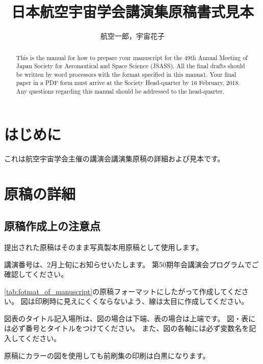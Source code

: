 \documentclass{jsass-nenkai}
\begin{document}

\title{日本航空宇宙学会講演集原稿書式見本}

\author{航空一郎，宇宙花子}


\begin{abstract}
  This is the manual for how to prepare your manuscript for the 49th Annual Meeting of Japan Society for Aeronautical and Space Science (JSASS).
  All the final drafts should be written by word processors with the format specified in this manua1.
  Your final paper in a PDF form must arrive at the Society Head-quarter by 16 February, 2018.
  Any questions regarding this manual should be addressed to the head-quarter.
\end{abstract}

\maketitle


\section{はじめに}
  これは航空宇宙学会主催の講演会講演集原稿の詳細および見本です。

\section{原稿の詳細}
  \subsection{原稿作成上の注意点}
    提出された原稿はそのまま写真製本用原稿として使用します。

    講演番号は、2月上旬にお知らせいたします。
    第50期年会講演会プログラムでご確認してください。

    \cref{tab:fotmat_of_manuscript}の原稿フォーマットにしたがって作成してください。
    図は印刷時に見えにくくならないよう、線は太目に作成してください。

    図表のタイトル記入場所は、図の場合は下端、表の場合は上端です。
    図・表には必ず番号とタイトルをつけてください。
    また、図の各軸には必ず変数名を記入してください。

    原稿にカラーの図を使用しても前刷集の印刷は白黒になります。
\end{document}
